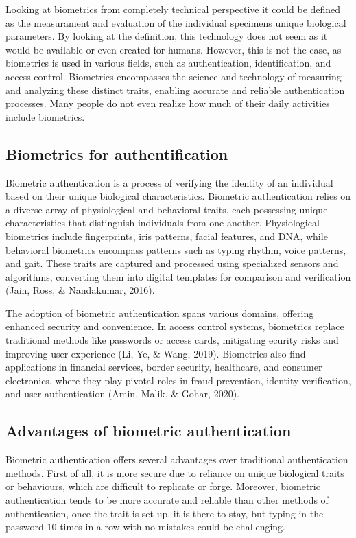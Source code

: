 \hspace{1 em} Looking at biometrics from completely technical perspective it could be defined as the measurament and evaluation of the 
individual specimens unique biological parameters. By looking at the definition, this technology does not seem as it  would be 
available or even created for humans. However, this is not the case, as biometrics is used in various fields, 
such as authentication, identification, and access control. Biometrics encompasses the science and technology of measuring and analyzing 
these distinct traits, enabling accurate and reliable authentication processes.  Many people do not even realize how much of their
daily activities include biometrics.

\subsection{Biometrics for authentification}
\hspace{1 em} Biometric authentication is a process of verifying the identity of an individual 
based on their unique biological characteristics. Biometric authentication relies on a diverse array of
 physiological and behavioral traits, each
 possessing unique characteristics that distinguish individuals from one another.  Physiological biometrics 
 include fingerprints, iris patterns, facial features, and DNA, while behavioral biometrics encompass
  patterns such as typing rhythm, voice patterns, and gait. These traits are captured and processed using 
specialized sensors and algorithms, converting them into digital 
 templates for comparison and verification (Jain, Ross, \& Nandakumar, 2016).

 The adoption of biometric authentication spans various domains, offering enhanced security and convenience. 
 In access control systems, biometrics replace traditional methods like passwords or access cards, mitigating 
 ecurity risks and improving user experience (Li, Ye, \& Wang, 2019). Biometrics also find applications in 
 financial services, border security, healthcare, and consumer electronics, where they play pivotal roles in 
 fraud prevention, identity verification, and user authentication (Amin, Malik, \& Gohar, 2020).

 \subsection{Advantages of biometric authentication}
    \hspace{1 em} Biometric authentication offers several advantages over traditional authentication methods.
    First of all, it is more secure due to reliance on unique biological traits or behaviours, which are difficult
    to replicate or forge. Moreover, biometric authentication tends to be more accurate and reliable than other
    methods of authentication, once the trait is set up, it is there to stay, but typing in the password 10 times 
    in a row with no mistakes could be challenging.

